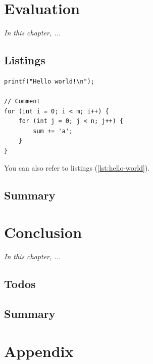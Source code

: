 \documentclass[
	12pt,
	a4paper,
	abstract,
	bibliography=totoc,
	chapterprefix,
	headings=openright,
	numbers=endperiod,
	parskip=half,
	twoside,
]{scrreprt}
\begin{document}
\chapter{Evaluation}
\label{cha:evaluation}

\textit{In this chapter, ...}

\section{Listings}

\begin{lstlisting}[caption=Caption,label=lst:hello-world]
printf("Hello world!\n");

// Comment
for (int i = 0; i < m; i++) {
	for (int j = 0; j < n; j++) {
		sum += 'a';
	}
}
\end{lstlisting}

You can also refer to listings (\cref{lst:hello-world}).

\section*{Summary}

\lipsum[2]

\chapter{Conclusion}
\label{cha:conclusion}

\textit{In this chapter, ...}

\section{Todos}


\lipsum[1-2]

\section*{Summary}

\lipsum[2]





\appendix

\chapter{Appendix}
\label{cha:appendix}
\end{document}
